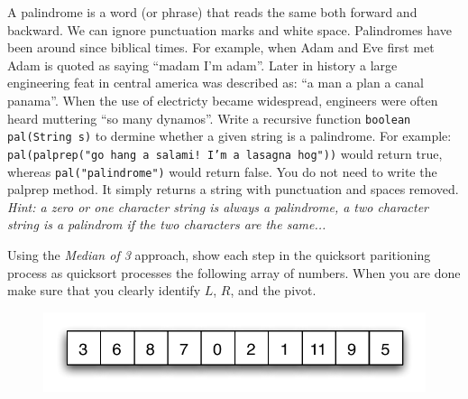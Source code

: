 \documentclass[11pt,letter]{exam}
\begin{document}
\begin{questions}
\begin{table}[h]
\end{table}
\newpage
\question[20]
A palindrome is a word (or phrase) that reads the same both forward and
backward. We can ignore punctuation marks and white space. Palindromes have been around since biblical
times. For example, when Adam and Eve first met Adam is quoted as saying ``madam I'm adam''.
Later in history a large engineering feat in central america was described as:
``a man a plan a canal panama''. When the use of electricty became widespread,
engineers were often heard muttering ``so many dynamos''. Write a recursive
function \texttt{boolean pal(String s)} to dermine whether a given string is a
palindrome. For example: \texttt{pal(palprep("go hang a salami! I'm a lasagna hog"))} 
would return true, whereas \texttt{pal("palindrome")} would return false.  
You do not need to write the palprep method. It simply returns a string with 
punctuation and spaces removed.  \textit{Hint: a zero or one character string is always
a palindrome, a two character string is a palindrom if the two characters are
the same...}


\newpage
\question[10] Using the \textit{Median of 3} approach, show each step
in the quicksort paritioning process as quicksort processes the following array
of numbers.  When you are done make sure that you clearly identify $L$, $R$, and
the pivot. 
\begin{figure}[h]
  \centering
  \includegraphics{part-array.pdf}
\end{figure}


\end{questions}
\end{document}
